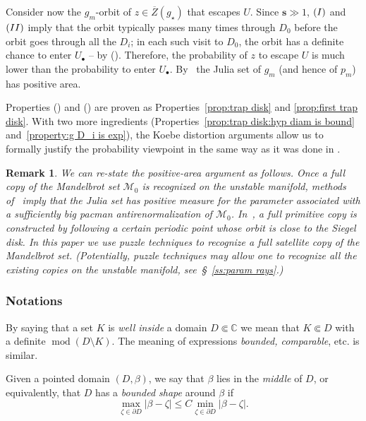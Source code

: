 \documentclass{amsart}
\newcommand{\1}{{\mathbb 1 }}
\newcommand\MM{\mathscr{M}}
\newcommand{\bbs}{{\mathbf s}}
\newcommand{\str}{{\star}}
\newcommand{\C}{\mathbb{C}}
\newtheorem{rem}[thm]{Remark}
\theoremstyle{remark}
\numberwithin{equation}{section}
\theoremstyle{definition}
\renewcommand{\mod}{\operatorname{mod}}
\newcommand{\RN}[1]{\MakeUppercase{\romannumeral#1}}%
\theoremstyle{nonumberbreak}
\begin{document}
Consider now the $g_m$-orbit of $z\in \overline Z(g_\str)$ that escapes $U$. Since $\bbs\gg 1$,  $(\RN{1})$ and $(\RN{2})$ imply that the orbit typically passes many times through $D_0$ before the orbit goes through all the $D_i$; in each such visit to $D_0$, the orbit has a definite chance to enter $U_\bullet$ -- by (\RN{3}). Therefore, the probability of $z$ to escape $U$ is much lower than the probability to enter $U_\bullet$. By~\cite{AL-AMS} the Julia set of $g_m$ (and hence of $p_m$) has positive area. 

Properties (\RN{2}) and (\RN{3}) are proven as Properties~\ref{prop:trap disk} and \ref{prop:first trap disk}. With two more ingredients (Properties~\ref{prop:trap disk:hyp diam is bound} and~\ref{property:g D_i is exp}), the Koebe distortion arguments allow us to formally justify the probability viewpoint in the same way as it was done in \cite{AL-posmeas}. 





\begin{rem}
\label{rem:posit area}
We can re-state the positive-area argument as follows. Once a full copy of the Mandelbrot set $\MM_0$ is recognized on the unstable manifold, methods of~\cite{AL-posmeas} imply that the Julia set has positive measure for the parameter associated with a sufficiently big pacman antirenormalization of $\MM_0$. In~\cite{AL-posmeas}, a full primitive copy is constructed by following a certain periodic point whose orbit is close to the Siegel disk. In this paper we use puzzle techniques to recognize a full satellite copy of the Mandelbrot set. (Potentially, puzzle techniques may allow one to recognize all the existing copies on the unstable manifold, see~\S~\ref{ss:param rays}.)          
\end{rem}

\subsubsection{Notations}\label{sss:Notat: posit Area}
By saying that a set $K$ is \emph{well inside}
a domain $D \Subset \C$ we mean that $K \Subset D$ with a definite $\mod(D \setminus K)$. The meaning
of expressions \emph{bounded, comparable}, etc. is similar.

Given a pointed domain $(D, \beta)$, we say that $\beta$ lies in the \emph{middle} of $D$, or equivalently,
that $D$ has a \emph{bounded shape} around $\beta$ if
\[\max _{\zeta\in \partial D} |\beta-\zeta| \le C\min_{\zeta\in \partial D} |\beta-\zeta|.\]
\end{document}
